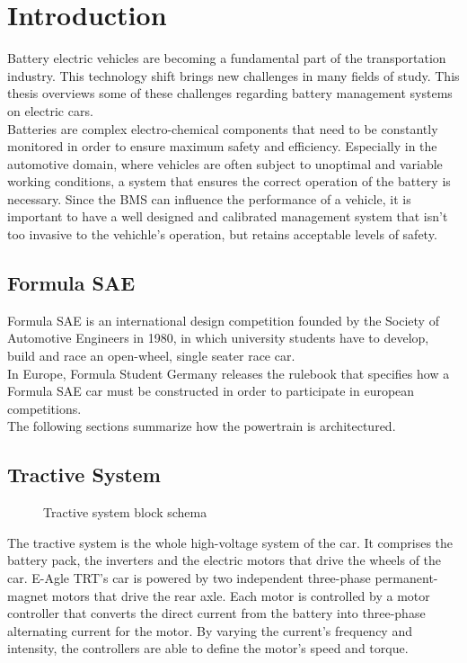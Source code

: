 \chapter{Introduction}
\label{cha:intro}
Battery electric vehicles are becoming a fundamental part of the transportation industry. This technology shift brings new challenges in many fields of study. This thesis overviews some of these challenges regarding battery management systems on electric cars.\\
Batteries are complex electro-chemical components that need to be constantly monitored in order to ensure maximum safety and efficiency. Especially in the automotive domain, where vehicles are often subject to unoptimal and variable working conditions, a system that ensures the correct operation of the battery is necessary. Since the BMS can influence the performance of a vehicle, it is important to have a well designed and calibrated management system that isn't too invasive to the vehichle's operation, but retains acceptable levels of safety.

\section{Formula SAE}
Formula SAE is an international design competition founded by the Society of Automotive Engineers in 1980, in which university students have to develop, build and race an open-wheel, single seater race car.\\
In Europe, Formula Student Germany releases the rulebook \cite{fsg2020} that specifies how a Formula SAE car must be constructed in order to participate in european competitions.\\
The following sections summarize how the powertrain is architectured.
\section{Tractive System}
\begin{figure}[h]
    \centering
    
    \caption{Tractive system block schema}
    \label{fig:tractive_system}
\end{figure}
The tractive system is the whole high-voltage system of the car. It comprises the battery pack, the inverters and the electric motors that drive the wheels of the car.
E-Agle TRT's car is powered by two independent three-phase permanent-magnet motors that drive the rear axle. Each motor is controlled by a motor controller that converts the direct current from the battery into three-phase alternating current for the motor. By varying the current's frequency and intensity, the controllers are able to define the motor's speed and torque.

